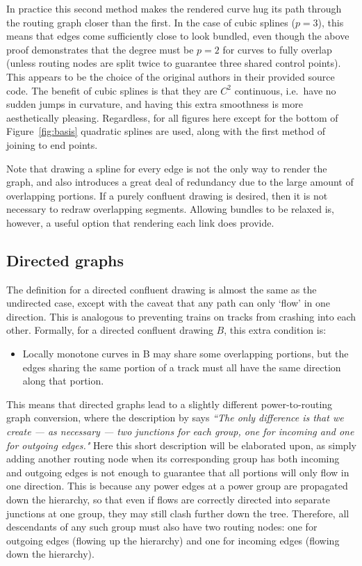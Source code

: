 In practice this second method makes the rendered curve hug its path through the routing graph closer than the first. In the case of cubic splines ($p=3$), this means that edges come sufficiently close to look bundled, even though the above proof demonstrates that the degree must be $p=2$ for curves to fully overlap (unless routing nodes are split twice to guarantee three shared control points).
This appears to be the choice of the original authors \citep{Bach2017} in their provided source code.
The benefit of cubic splines is that they are $C^2$ continuous, i.e.\  have no sudden jumps in curvature, and having this extra smoothness is more aesthetically pleasing. Regardless, for all figures here except for the bottom of Figure~\ref{fig:basis} quadratic splines are used, along with the first method of joining to end points.

Note that drawing a spline for every edge is not the only way to render the graph, and also introduces a great deal of redundancy due to the large amount of overlapping portions. If a purely confluent drawing is desired, then it is not necessary to redraw overlapping segments.
Allowing bundles to be relaxed \citep[Fig.~18]{Bach2017} is, however, a useful option that rendering each link does provide.

\subsection{Directed graphs}
\label{sec:power_directed}
The definition for a directed confluent drawing is almost the same as the undirected case, except with the caveat that any path can only `flow' in one direction. This is analogous to preventing trains on tracks from crashing into each other. 
Formally, for a directed confluent drawing $B$, this extra condition \citep{Dickerson2005} is:
\begin{mdframed}[backgroundcolor=WhiteSmoke]
\begin{itemize}[leftmargin=*]
  \item Locally monotone curves in B may share some overlapping portions, but the edges sharing the same portion of a track must all have the same direction along that portion.
\end{itemize}
\end{mdframed}
This means that directed graphs lead to a slightly different power-to-routing graph conversion, where the description by \citet{Bach2017} says \emph{``The only difference is that we create --- as necessary --- two junctions for each group, one for incoming and one for outgoing edges."}
Here this short description will be elaborated upon, as simply adding another routing node when its corresponding group has both incoming and outgoing edges is not enough to guarantee that all portions will only flow in one direction.
This is because any power edges at a power group are propagated down the hierarchy, so that even if flows are correctly directed into separate junctions at one group, they may still clash further down the tree.
Therefore, all descendants of any such group must also have two routing nodes: one for outgoing edges (flowing up the hierarchy) and one for incoming edges (flowing down the hierarchy).

